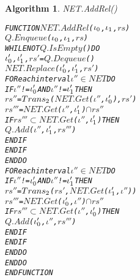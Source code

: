 \documentclass[11pt]{report}
\newenvironment{vverbatim}
{
  \begin{alltt}
}
{
    \vspace{-\baselineskip}
  \end{alltt}
}
\newtheorem{vvalgorithm}{Algorithm}[chapter]
\newenvironment{valgorithm}[2]
{
  \begin{vvalgorithm}{#1}
    \label{#2}
    \small
    \begin{vverbatim}
}
{
    \end{vverbatim}
  \end{vvalgorithm}
}
\begin{document}
          \begin{valgorithm}{NET.AddRel()}{algo-tempo-ntadd}
FUNCTION \(NET.AddRel\)(\(\iota\sb{0}\), \(\iota\sb{1}\), \(rs\))
  \(Q.Enqueue\)(\(\iota\sb{0}\), \(\iota\sb{1}\), \(rs\))
  WHILE NOT \(Q.IsEmpty\)() DO
    \(\iota\sb{0}'\), \(\iota\sb{1}'\), \(rs'\) = \(Q.Dequeue\)()
    \(NET.Replace\)(\(\iota\sb{0}'\), \(\iota\sb{1}'\), \(rs'\))
    FOR each interval \(\iota''\) \(\in\) \(NET\) DO
      IF \(\iota''\) != \(\iota\sb{0}'\) AND \(\iota''\) != \(\iota\sb{1}'\) THEN
        \(rs''\) =  \(Trans\sb{2}\)(\(NET.Get\)(\(\iota''\), \(\iota\sb{0}'\)), \(rs'\))
        \(rs'''\) = \(NET.Get\)(\(\iota''\), \(\iota\sb{1}'\)) \(\cap\) \(rs''\)
        IF \(rs'''\) \(\subset\) \(NET.Get\)(\(\iota''\), \(\iota\sb{1}'\)) THEN
          \(Q.Add\)(\(\iota''\), \(\iota\sb{1}'\), \(rs'''\))
        ENDIF
      ENDIF
    ENDDO
    FOR each interval \(\iota''\) \(\in\) \(NET\) DO
      IF \(\iota''\) != \(\iota\sb{0}'\) AND \(\iota''\) != \(\iota\sb{1}'\) THEN
        \(rs''\) =  \(Trans\sb{2}\)(\(rs'\), \(NET.Get\)(\(\iota\sb{1}'\), \(\iota''\)))
        \(rs'''\) = \(NET.Get\)(\(\iota\sb{0}'\), \(\iota''\)) \(\cap\) \(rs''\)
        IF \(rs'''\) \(\subset\) \(NET.Get\)(\(\iota''\), \(\iota\sb{0}'\)) THEN
          \(Q.Add\)(\(\iota\sb{0}'\), \(\iota''\), \(rs'''\))
        ENDIF
      ENDIF
    ENDDO
  ENDDO
ENDFUNCTION
          \end{valgorithm}
\end{document}
